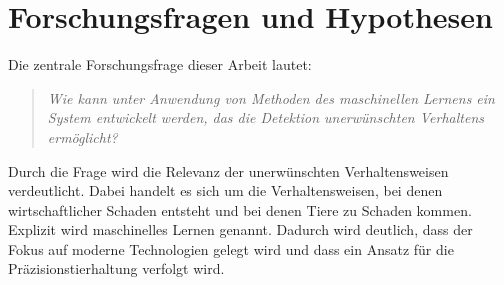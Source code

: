 \section{Forschungsfragen und Hypothesen}

Die zentrale Forschungsfrage dieser Arbeit lautet: 

\begin{quote}
    \textit{Wie kann unter Anwendung von Methoden des maschinellen Lernens ein System entwickelt werden, das die Detektion unerwünschten Verhaltens ermöglicht?}
\end{quote}

Durch die Frage wird die Relevanz der unerwünschten Verhaltensweisen verdeutlicht. Dabei handelt es sich um die Verhaltensweisen, bei denen wirtschaftlicher Schaden entsteht und bei denen Tiere zu Schaden kommen. Explizit wird maschinelles Lernen genannt. Dadurch wird deutlich, dass der Fokus auf moderne Technologien gelegt wird und dass ein Ansatz für die Präzisionstierhaltung verfolgt wird. 